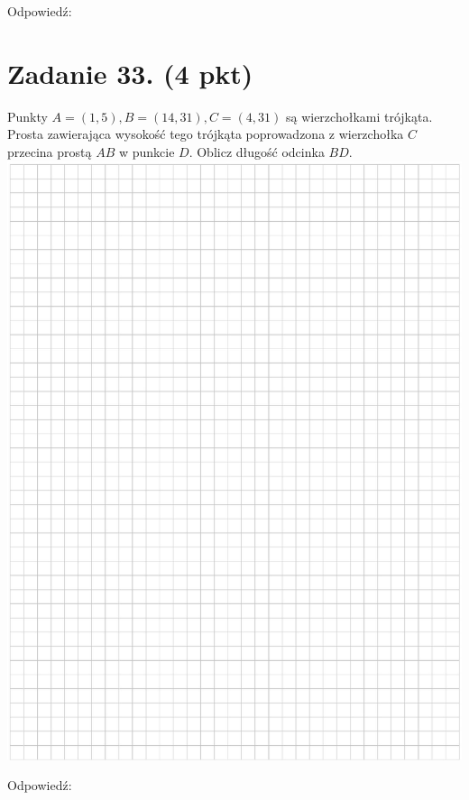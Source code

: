 \documentclass[10pt]{article}
\begin{document}
Odpowiedź:

\section*{Zadanie 33. (4 pkt)}
Punkty \(A=(1,5), B=(14,31), C=(4,31)\) są wierzchołkami trójkąta. Prosta zawierająca wysokość tego trójkąta poprowadzona z wierzchołka \(C\) przecina prostą \(A B\) w punkcie \(D\). Oblicz długość odcinka \(B D\).\\
\includegraphics[max width=\textwidth, center]{2024_11_21_603d5c1b2a7d8d68f45fg-17}

Odpowiedź:
\end{document}
